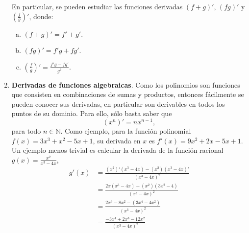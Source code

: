 \documentclass[10pt]{article}
\newcommand{\2}[1]{\hspace{-0.93cm}\colorbox{color1}{\hspace{0.07cm} \parbox{17cm}{\vspace{0.2cm} #1}\hspace*{0.07cm} }}
\newcommand{\3}[1]{\hspace{-0.93cm}\colorbox{color7}{\hspace{0.07cm} \parbox{17cm}{\vspace{0.2cm} #1}\hspace*{0.07cm} }}
\theoremstyle{theorem}
\numberwithin{equation}{section}
\begin{document}
\begin{enumerate}[1.]
\begin{enumerate}[a.]
    \end{enumerate}
    En particular, se pueden estudiar las funciones derivadas $(f+g)'$, $(fg)'$ y $\displaystyle \left(\frac{f}{g}\right)'$, donde:
    \begin{enumerate}[a.]
        \item $(f+g)'=f'+g'$.
        \item $(fg)'=f'g+fg'$. 
        \item $\displaystyle \left(\frac{f}{g}\right)'=\frac{f'g-fg'}{g^2}$.
    \end{enumerate}
       \item \textbf{Derivadas de funciones algebraicas}. Como los polinomios son funciones que consisten en combinaciones de sumas y productos, entonces f\'acilmente se pueden conocer sus derivadas, en particular son derivables en todos los puntos de su dominio. Para ello, s\'olo basta saber que 
    \begin{equation*}
        (x^n)'=nx^{n-1}, 
    \end{equation*} para todo $n\in \mathbb{N}$. Como ejemplo, para la funci\'on polinomial $f(x)=3x^3+x^2-5x+1$, su derivada en $x$ es $f'(x)=9x^2+2x-5x+1$. Un ejemplo menos trivial es calcular la derivada de la funci\'on racional $\displaystyle g(x)=\frac{x^2}{x^3-4x}$,
    \begin{align*}
      g'(x)&=\frac{(x^2)'(x^3-4x)-(x^2)(x^3-4x)'}{(x^3-4x)^2}\\
           &=\frac{2x(x^3-4x)-(x^2)(3x^2-4)}{(x^3-4x)^2}\\
           &=\frac{2x^3-8x^2-(3x^4-4x^2)}{(x^3-4x)^2}\\
           &=\frac{-3x^4+2x^3-12x^2}{(x^3-4x)^2}\\
    \end{align*}           



\end{enumerate}
\end{document}
